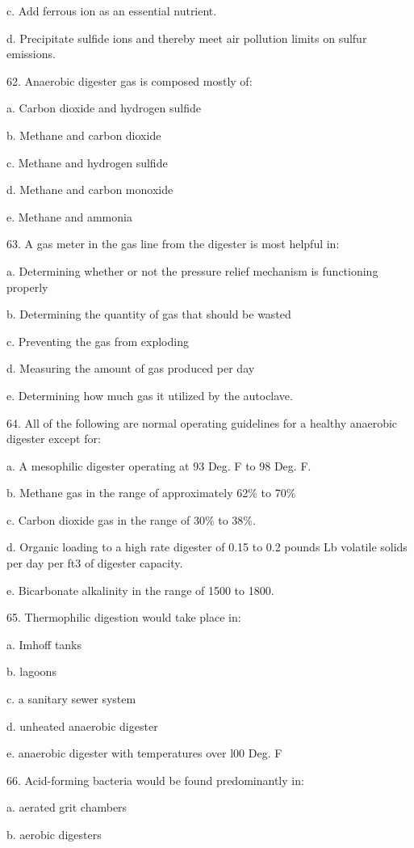 \documentclass{article}
\begin{document}
c. Add ferrous ion as an essential nutrient. 

d. Precipitate sulfide ions and thereby meet air pollution limits on sulfur emissions. 


62. Anaerobic digester gas is composed mostly of: 

a. Carbon dioxide and hydrogen sulfide 

b. Methane and carbon dioxide 

c. Methane and hydrogen sulfide 

d. Methane and carbon monoxide 

e. Methane and ammonia 


63. A gas meter in the gas line from the digester is most helpful in: 

a. Determining whether or not the pressure relief mechanism is functioning properly 

b. Determining the quantity of gas that should be wasted 

c. Preventing the gas from exploding 

d. Measuring the amount of gas produced per day 

e. Determining how much gas it utilized by the autoclave. 


64. All of the following are normal operating guidelines for a healthy anaerobic digester except for: 

a. A mesophilic digester operating at 93 Deg. F to 98 Deg. F. 

b. Methane gas in the range of approximately 62\% to 70\% 

c. Carbon dioxide gas in the range of 30\% to 38\%. 

d. Organic loading to a high rate digester of 0.15 to 0.2 pounds Lb volatile solids per day per ft3 of digester capacity. 

e. Bicarbonate alkalinity in the range of 1500 to 1800. 


65. Thermophilic digestion would take place in: 

a. Imhoff tanks 

b. lagoons 

c. a sanitary sewer system 

d. unheated anaerobic digester 

e. anaerobic digester with temperatures over l00 Deg. F 


66. Acid-forming bacteria would be found predominantly in: 

a. aerated grit chambers 

b. aerobic digesters 
\end{document}
